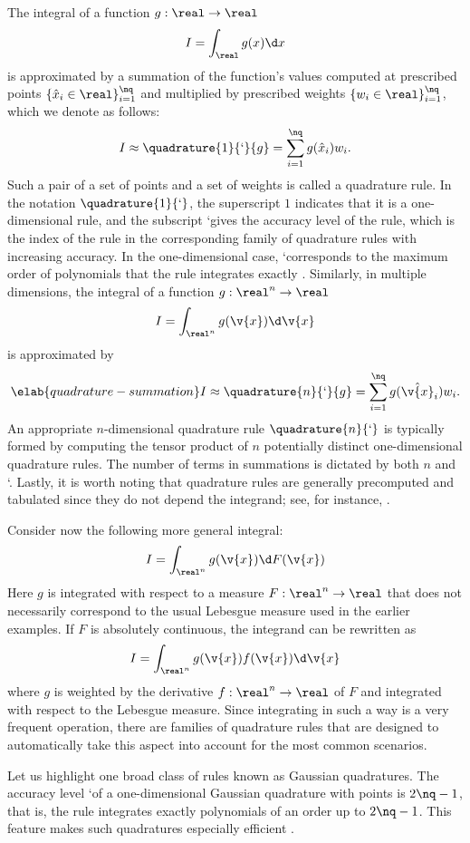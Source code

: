 The integral of a function $g: \real \to \real$
\[
  I = \int_\real g(x) \d x
\]
is approximated by a summation of the function's values computed at prescribed
points $\{ \hat{x}_i \in \real \}_{i = 1}^\nq$ and multiplied by prescribed
weights $\{ w_i \in \real \}_{i = 1}^\nq$, which we denote as follows:
\[
  I \approx \quadrature{1}{\lq}{g} = \sum_{i = 1}^\nq g(\hat{x}_i) w_i.
\]
Such a pair of a set of points and a set of weights is called a quadrature rule.
In the notation $\quadrature{1}{\lq}$, the superscript $1$ indicates that it is
a one-dimensional rule, and the subscript \lq gives the accuracy level of the
rule, which is the index of the rule in the corresponding family of quadrature
rules with increasing accuracy. In the one-dimensional case, \lq corresponds to
the maximum order of polynomials that the rule integrates exactly
\cite{heiss2008}. Similarly, in multiple dimensions, the integral of a function
$g: \real^n \to \real$
\[
  I = \int_{\real^n} g(\v{x}) \d \v{x}
\]
is approximated by
\begin{equation} \elab{quadrature-summation}
  I \approx \quadrature{n}{\lq}{g} = \sum_{i = 1}^\nq g(\hat{\v{x}}_i) w_i.
\end{equation}
An appropriate $n$-dimensional quadrature rule $\quadrature{n}{\lq}$ is
typically formed by computing the tensor product of $n$ potentially distinct
one-dimensional quadrature rules. The number of terms \nq in summations is
dictated by both $n$ and \lq. Lastly, it is worth noting that quadrature rules
are generally precomputed and tabulated since they do not depend the integrand;
see, for instance, \cite{burkardt}.

Consider now the following more general integral:
\[
  I = \int_{\real^n} g(\v{x}) \d F(\v{x})
\]
Here $g$ is integrated with respect to a measure $F: \real^n \to \real$
\cite{durrett2010} that does not necessarily correspond to the usual Lebesgue
measure used in the earlier examples. If $F$ is absolutely continuous, the
integrand can be rewritten as
\[
  I = \int_{\real^n} g(\v{x}) f(\v{x}) \d \v{x}
\]
where $g$ is weighted by the derivative $f: \real^n \to \real$ of $F$ and
integrated with respect to the Lebesgue measure. Since integrating in such a way
is a very frequent operation, there are families of quadrature rules that are
designed to automatically take this aspect into account for the most common
scenarios.

Let us highlight one broad class of rules known as Gaussian quadratures. The
accuracy level \lq of a one-dimensional Gaussian quadrature with \nq points is
$2 \nq - 1$, that is, the rule integrates exactly polynomials of an order up to
$2 \nq - 1$. This feature makes such quadratures especially efficient
\cite{heiss2008}.

